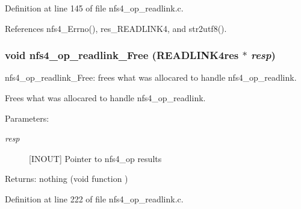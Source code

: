 Definition at line 145 of file nfs4\_\-op\_\-readlink.c.

References nfs4\_\-Errno(), res\_\-READLINK4, and str2utf8().
\subsubsection{\setlength{\rightskip}{0pt plus 5cm}void nfs4\_\-op\_\-readlink\_\-Free (READLINK4res $\ast$ {\em resp})}\label{nfs4__op__readlink_8c_a3}


nfs4\_\-op\_\-readlink\_\-Free: frees what was allocared to handle nfs4\_\-op\_\-readlink.

Frees what was allocared to handle nfs4\_\-op\_\-readlink.

\begin{Desc}
\item[Parameters:]
\begin{description}
\item[{\em resp}][INOUT] Pointer to nfs4\_\-op results\end{description}
\end{Desc}
\begin{Desc}
\item[Returns:]nothing (void function ) \end{Desc}


Definition at line 222 of file nfs4\_\-op\_\-readlink.c.